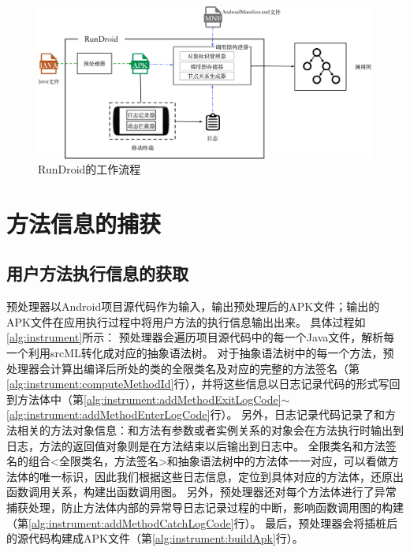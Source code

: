 \begin{figure}[!ht]
	\centering
	\includegraphics[width=\textwidth]{./Figures/rundroid-overview.png}
	\caption{ RunDroid的工作流程}
	\label{fig:rundroid_overview}
\end{figure}

\section{方法信息的捕获}

\subsection{用户方法执行信息的获取}%


预处理器以Android项目源代码作为输入，输出预处理后的APK文件；输出的APK文件在应用执行过程中将用户方法的执行信息输出出来。
具体过程如\autoref{alg:instrument}所示：
预处理器会遍历项目源代码中的每一个Java文件，解析每一个利用srcML转化成对应的抽象语法树。
对于抽象语法树中的每一个方法，预处理器会计算出编译后所处的类的全限类名及对应的完整的方法签名（第\ref{alg:instrument:computeMethodId}行），并将这些信息以日志记录代码的形式写回到方法体中（第\ref{alg:instrument:addMethodExitLogCode}$\sim$\ref{alg:instrument:addMethodEnterLogCode}行）。
另外，日志记录代码记录了和方法相关的方法对象信息：和方法有参数或者实例关系的对象会在方法执行时输出到日志，方法的返回值对象则是在方法结束以后输出到日志中。
全限类名和方法签名的组合<全限类名，方法签名>和抽象语法树中的方法体一一对应，可以看做方法体的唯一标识，因此我们根据这些日志信息，定位到具体对应的方法体，还原出函数调用关系，构建出函数调用图。
另外，预处理器还对每个方法体进行了异常捕获处理，防止方法体内部的异常导日志记录过程的中断，影响函数调用图的构建（第\ref{alg:instrument:addMethodCatchLogCode}行）。
最后，预处理器会将插桩后的源代码构建成APK文件（第\ref{alg:instrument:buildApk}行）。




